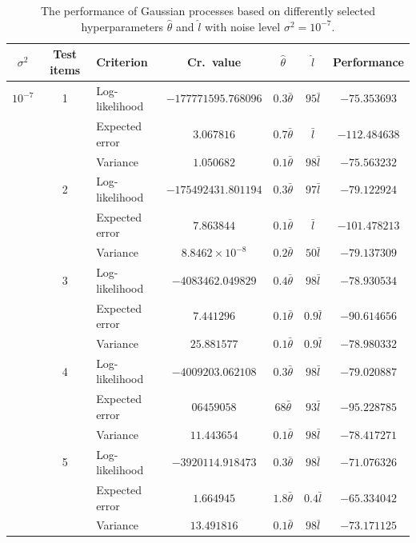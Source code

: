 \documentclass[a4paper,11pt]{article}
\begin{document}
\begin{table}
  \caption{The performance of Gaussian processes based on differently selected hyperparameters $\hat\theta$ and $\hat l$ with noise level $\sigma^2=10^{-7}$.}
  \label{tab:s7}
  \begin{tabular}{cclcccc}
    \hline
    $\sigma^2$ & Test items & Criterion & Cr.\ value & $\hat\theta$ & $\hat l$ & Performance \\
    \hline
    \hline
    $10^{-7}$ & 1 & Log-likelihood & $-177771595.768096$ & $0.3\bar\theta$ & $95 \bar l$ & $-75.353693$ \\
              &   & Expected error & $3.067816$ & $0.7\bar\theta$ & $\bar l$ & $-112.484638$ \\
              &   & Variance & $1.050682$ & $0.1\bar\theta$ & $98\bar l$ & $-75.563232$ \\
    \hline
              & 2 & Log-likelihood & $-175492431.801194$ & $0.3\bar\theta$ & $97 \bar l$ & $-79.122924$ \\
              &   & Expected error & $7.863844$ & $0.1\bar\theta$ & $\bar l$ & $-101.478213$ \\
              &   & Variance & $8.8462 \times 10^{-8}$ & $0.2\bar\theta$ & $50\bar l$ & $-79.137309$ \\
    \hline
              & 3 & Log-likelihood & $-4083462.049829$ & $0.4\bar\theta$ & $98 \bar l$ & $-78.930534$ \\
              &   & Expected error & $7.441296$ & $0.1\bar\theta$ & $0.9 \bar l$ & $-90.614656$ \\
              &   & Variance & $25.881577$ & $0.1\bar\theta$ & $0.9\bar l$ & $-78.980332$ \\
    \hline
              & 4 & Log-likelihood & $-4009203.062108$ & $0.3\bar\theta$ & $98 \bar l$ & $-79.020887$ \\
              &   & Expected error & $06459058$ & $68\bar\theta$ & $93\bar l$ & $-95.228785$ \\
              &   & Variance & $11.443654$ & $0.1\bar\theta$ & $98\bar l$ & $-78.417271$ \\
    \hline
              & 5 & Log-likelihood & $-3920114.918473$ & $0.3\bar\theta$ & $98 \bar l$ & $-71.076326$ \\
              &   & Expected error & $1.664945$ & $1.8\bar\theta$ & $0.4\bar l$ & $-65.334042$ \\
              &   & Variance & $13.491816$ & $0.1\bar\theta$ & $98\bar l$ & $-73.171125$ \\
    \hline
  \end{tabular}
\end{table}
\end{document}
